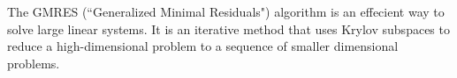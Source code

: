 \label{lab:GMRES}

The GMRES (``Generalized Minimal Residuals") algorithm is an effecient way to solve large linear systems.
It is an iterative method that uses Krylov subspaces to reduce a high-dimensional problem to a sequence of smaller dimensional
problems.

